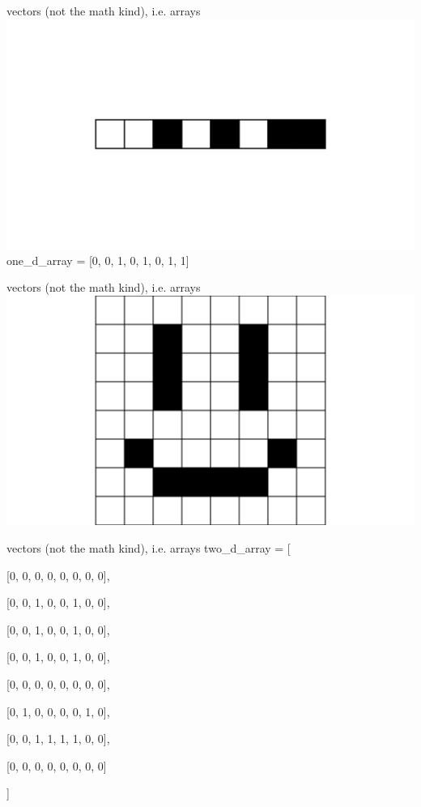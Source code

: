\documentclass{beamer}
\begin{document}
	\begin{frame}{vectors (not the math kind), i.e. arrays}
		\vfill
		\includegraphics[width=\linewidth,height=0.85\textheight,keepaspectratio]{../assets/1d-array.png}
		\vfill
		\small
			one\_d\_array = [0, 0, 1, 0, 1, 0, 1, 1]
		\vfill
	\end{frame}
	
	\begin{frame}{vectors (not the math kind), i.e. arrays}
		\vfill
		\includegraphics[width=\linewidth,height=0.85\textheight,keepaspectratio]{../assets/2d-array.png}
		\vfill
	\end{frame}
	
	\begin{frame}{vectors (not the math kind), i.e. arrays}
		\vfill
		\small
			two\_d\_array = [
			
			[0, 0, 0, 0, 0, 0, 0, 0],
			
			[0, 0, 1, 0, 0, 1, 0, 0],
			
			[0, 0, 1, 0, 0, 1, 0, 0],
			
			[0, 0, 1, 0, 0, 1, 0, 0],
			
			[0, 0, 0, 0, 0, 0, 0, 0],
			
			[0, 1, 0, 0, 0, 0, 1, 0],
			
			[0, 0, 1, 1, 1, 1, 0, 0],
			
			[0, 0, 0, 0, 0, 0, 0, 0]
			
		]
		\vfill
	\end{frame}
	
\end{document}
